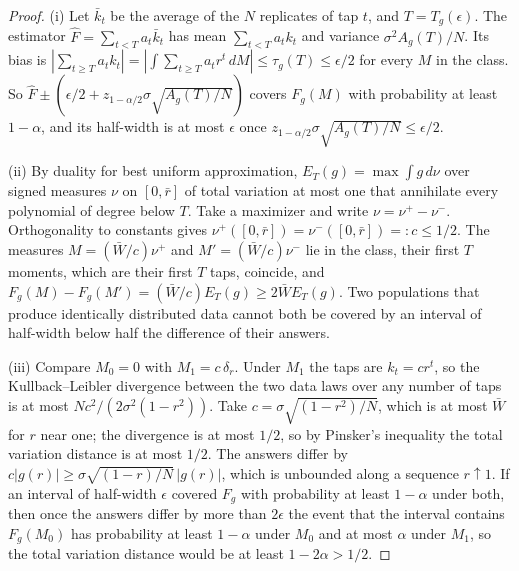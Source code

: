 \documentclass[12pt]{article}
\theoremstyle{definition}
\theoremstyle{remark}
\begin{document}
\begin{proof}
(i) Let $\bar k_t$ be the average of the $N$ replicates of tap $t$, and $T=T_g(\epsilon)$. The estimator $\hat F=\sum_{t<T}a_t\bar k_t$ has mean $\sum_{t<T}a_tk_t$ and variance $\sigma^2A_g(T)/N$. Its bias is $|\sum_{t\ge T}a_tk_t|=|\int\sum_{t\ge T}a_tr^t\,dM|\le\tau_g(T)\le\epsilon/2$ for every $M$ in the class. So $\hat F\pm(\epsilon/2+z_{1-\alpha/2}\sigma\sqrt{A_g(T)/N})$ covers $F_g(M)$ with probability at least $1-\alpha$, and its half-width is at most $\epsilon$ once $z_{1-\alpha/2}\sigma\sqrt{A_g(T)/N}\le\epsilon/2$.

(ii) By duality for best uniform approximation, $E_T(g)=\max\int g\,d\nu$ over signed measures $\nu$ on $[0,\bar r]$ of total variation at most one that annihilate every polynomial of degree below $T$. Take a maximizer and write $\nu=\nu^+-\nu^-$. Orthogonality to constants gives $\nu^+([0,\bar r])=\nu^-([0,\bar r])=:c\le1/2$. The measures $M=(\bar W/c)\nu^+$ and $M'=(\bar W/c)\nu^-$ lie in the class, their first $T$ moments, which are their first $T$ taps, coincide, and $F_g(M)-F_g(M')=(\bar W/c)E_T(g)\ge2\bar WE_T(g)$. Two populations that produce identically distributed data cannot both be covered by an interval of half-width below half the difference of their answers.

(iii) Compare $M_0=0$ with $M_1=c\,\delta_r$. Under $M_1$ the taps are $k_t=cr^t$, so the Kullback--Leibler divergence between the two data laws over any number of taps is at most $Nc^2/(2\sigma^2(1-r^2))$. Take $c=\sigma\sqrt{(1-r^2)/N}$, which is at most $\bar W$ for $r$ near one; the divergence is at most $1/2$, so by Pinsker's inequality the total variation distance is at most $1/2$. The answers differ by $c|g(r)|\ge\sigma\sqrt{(1-r)/N}\,|g(r)|$, which is unbounded along a sequence $r\uparrow1$. If an interval of half-width $\epsilon$ covered $F_g$ with probability at least $1-\alpha$ under both, then once the answers differ by more than $2\epsilon$ the event that the interval contains $F_g(M_0)$ has probability at least $1-\alpha$ under $M_0$ and at most $\alpha$ under $M_1$, so the total variation distance would be at least $1-2\alpha>1/2$.


\end{proof}
\end{document}
